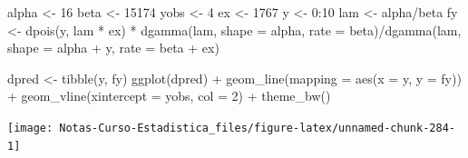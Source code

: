 \documentclass[
  12pt,
]{book}
\newenvironment{Shaded}{\begin{snugshade}}{\end{snugshade}}
\newcommand{\AttributeTok}[1]{\textcolor[rgb]{0.77,0.63,0.00}{#1}}
\newcommand{\DecValTok}[1]{\textcolor[rgb]{0.00,0.00,0.81}{#1}}
\newcommand{\FunctionTok}[1]{\textcolor[rgb]{0.00,0.00,0.00}{#1}}
\newcommand{\NormalTok}[1]{#1}
\newcommand{\OtherTok}[1]{\textcolor[rgb]{0.56,0.35,0.01}{#1}}
\newcommand{\SpecialCharTok}[1]{\textcolor[rgb]{0.00,0.00,0.00}{#1}}
\begin{document}
\begin{Shaded}
\begin{Highlighting}[]
\NormalTok{alpha }\OtherTok{\textless{}{-}} \DecValTok{16}
\NormalTok{beta }\OtherTok{\textless{}{-}} \DecValTok{15174}
\NormalTok{yobs }\OtherTok{\textless{}{-}} \DecValTok{4}
\NormalTok{ex }\OtherTok{\textless{}{-}} \DecValTok{1767}
\NormalTok{y }\OtherTok{\textless{}{-}} \DecValTok{0}\SpecialCharTok{:}\DecValTok{10}
\NormalTok{lam }\OtherTok{\textless{}{-}}\NormalTok{ alpha}\SpecialCharTok{/}\NormalTok{beta}
\NormalTok{fy }\OtherTok{\textless{}{-}} \FunctionTok{dpois}\NormalTok{(y, lam }\SpecialCharTok{*}\NormalTok{ ex) }\SpecialCharTok{*} \FunctionTok{dgamma}\NormalTok{(lam, }\AttributeTok{shape =}\NormalTok{ alpha,}
    \AttributeTok{rate =}\NormalTok{ beta)}\SpecialCharTok{/}\FunctionTok{dgamma}\NormalTok{(lam, }\AttributeTok{shape =}\NormalTok{ alpha }\SpecialCharTok{+}\NormalTok{ y, }\AttributeTok{rate =}\NormalTok{ beta }\SpecialCharTok{+}
\NormalTok{    ex)}

\NormalTok{dpred }\OtherTok{\textless{}{-}} \FunctionTok{tibble}\NormalTok{(y, fy)}
\FunctionTok{ggplot}\NormalTok{(dpred) }\SpecialCharTok{+} \FunctionTok{geom\_line}\NormalTok{(}\AttributeTok{mapping =} \FunctionTok{aes}\NormalTok{(}\AttributeTok{x =}\NormalTok{ y, }\AttributeTok{y =}\NormalTok{ fy)) }\SpecialCharTok{+}
    \FunctionTok{geom\_vline}\NormalTok{(}\AttributeTok{xintercept =}\NormalTok{ yobs, }\AttributeTok{col =} \DecValTok{2}\NormalTok{) }\SpecialCharTok{+} \FunctionTok{theme\_bw}\NormalTok{()}
\end{Highlighting}
\end{Shaded}

\begin{center}\texttt{[image: Notas-Curso-Estadistica\_files/figure-latex/unnamed-chunk-284-1]} \end{center}
\end{document}
